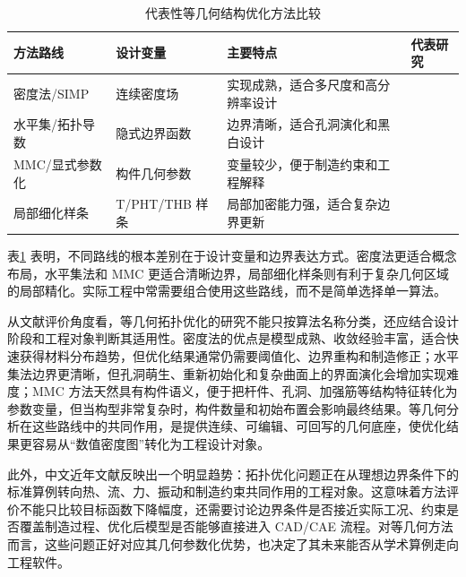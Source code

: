 \begin{table}[H]
    \caption{代表性等几何结构优化方法比较}
    \label{tab:method_compare}
    \centering
    \scriptsize
    \setlength{\tabcolsep}{2.8pt}
    \renewcommand{\arraystretch}{1.14}
    \begin{tabular}{p{}p{}p{}p{}}\toprule
        方法路线 & 设计变量 & 主要特点 & 代表研究 \\\midrule
        密度法/SIMP & 连续密度场 & 实现成熟，适合多尺度和高分辨率设计 & \cite{Gao2019IJNME,Wang2019AdvEngSoft} \\
        水平集/拓扑导数 & 隐式边界函数 & 边界清晰，适合孔洞演化和黑白设计 & \cite{Xu2019FME,HubnerScherer2024CMA,Teixeira2025ArXivTD} \\
        MMC/显式参数化 & 构件几何参数 & 变量较少，便于制造约束和工程解释 & \cite{Hou2017CMA,Xie2018CMA,Xue2019CJCM} \\
        局部细化样条 & T/PHT/THB 样条 & 局部加密能力强，适合复杂边界更新 & \cite{Zhang2024CMATsplines,Wen2023ArXivPHT,Zhu2023CMESTHB} \\\bottomrule
    \end{tabular}
\end{table}

表\ref{tab:method_compare} 表明，不同路线的根本差别在于设计变量和边界表达方式。密度法更适合概念布局，水平集法和 MMC 更适合清晰边界，局部细化样条则有利于复杂几何区域的局部精化。实际工程中常需要组合使用这些路线，而不是简单选择单一算法。

从文献评价角度看，等几何拓扑优化的研究不能只按算法名称分类，还应结合设计阶段和工程对象判断其适用性。密度法的优点是模型成熟、收敛经验丰富，适合快速获得材料分布趋势，但优化结果通常仍需要阈值化、边界重构和制造修正；水平集法边界更清晰，但孔洞萌生、重新初始化和复杂曲面上的界面演化会增加实现难度；MMC 方法天然具有构件语义，便于把杆件、孔洞、加强筋等结构特征转化为参数变量，但当构型非常复杂时，构件数量和初始布置会影响最终结果。等几何分析在这些路线中的共同作用，是提供连续、可编辑、可回写的几何底座，使优化结果更容易从“数值密度图”转化为工程设计对象。

此外，中文近年文献反映出一个明显趋势：拓扑优化问题正在从理想边界条件下的标准算例转向热、流、力、振动和制造约束共同作用的工程对象\cite{LiBaotong2024JME}。这意味着方法评价不能只比较目标函数下降幅度，还需要讨论边界条件是否接近实际工况、约束是否覆盖制造过程、优化后模型是否能够直接进入 CAD/CAE 流程。对等几何方法而言，这些问题正好对应其几何参数化优势，也决定了其未来能否从学术算例走向工程软件。

